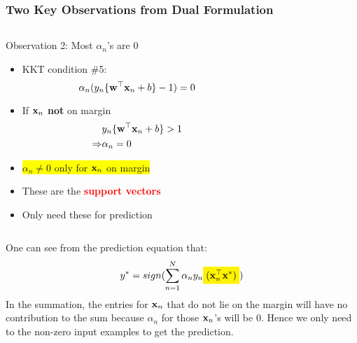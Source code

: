 \documentclass[10pt]{beamer}
\newcommand{\hilight}[1]{\colorbox{yellow}{#1}}
\newcommand{\hilightbox}[1]{%
  \colorbox{yellow}{$\displaystyle#1$}}
\begin{document}
\begin{frame}
      {
        \frametitle{Two Key Observations from Dual Formulation}
      }
      \begin{columns}
        \begin{column}{0.5\textwidth}
          \begin{block}{Observation 2: Most $\alpha_n$'s are 0}
            \begin{itemize}
            \item KKT condition \#5:
              \[
              \alpha_n(y_n\{{\bf w}^\top{\bf x}_n + b\} - 1) = 0
              \]
            \item If ${\bf x}_n$ {\bf not} on margin
              \begin{eqnarray*}
              & y_n\{{\bf w}^\top{\bf x}_n + b\} > 1\\
              \Rightarrow & \alpha_n  = 0
              \end{eqnarray*}
            \item \hilight{$\alpha_n \neq 0$ only for ${\bf x}_n$ on margin}
            \item These are the \textcolor{red}{{\bf support vectors}}
            \item Only need these for prediction
            \end{itemize}
          \end{block}
        \end{column}
        \begin{column}{0.5\textwidth}
          
        \end{column}
      \end{columns}
          {
            One can see from the prediction equation that:
            \[
            y^* = sign(\sum_{n=1}^N\alpha_ny_n\hilightbox{({\bf x}_n^\top{\bf x}^*)})
            \]
            In the summation, the entries for ${\bf x}_n$ that do not lie on the margin will have no contribution to the sum because $\alpha_n$ for those ${\bf x}_n$'s will be 0. Hence we only need to the non-zero input examples to get the prediction.
          }
\end{frame}
\end{document}
